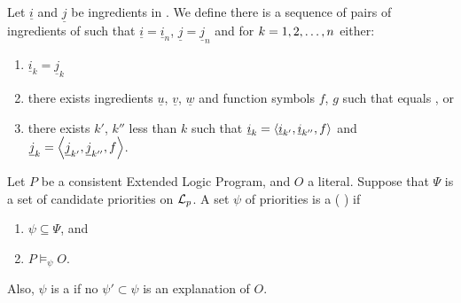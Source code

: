 \begin{defi}
Let $\underline{i}$ and $\underline{j}$ be ingredients in . We define  \iffTx{} there is a sequence of pairs  of ingredients of  such that $\underline{i}=\underline{i}_n$, $\underline{j}=\underline{j}_n$ and for $k=1,2,\ldots,n$ either:
\begin{enumerate}
 \item $\underline{i}_k=\underline{j}_k$
 \item there exists ingredients $\underline{u}$, $\underline{v}$, $\underline{w}$ and function symbols $f$, $g$ such that  equals , or
 \item there exists $k'$, $k''$ less than $k$ such that $\underline{i}_k=\left\langle \underline{i}_{k'},\underline{i}_{k''},f\right\rangle$ and $\underline{j}_k=\left\langle \underline{j}_{k'},\underline{j}_{k''},f\right\rangle$.
\end{enumerate}
\cite{conf/ijcai/Geiser75}
\end{defi}

\begin{defi}
Let $P$ be a consistent Extended Logic Program, and $O$ a literal. Suppose that $\Psi$ is a set of candidate priorities on $\mathcal{L}_p$. A set $\psi$ of priorities is a  (\wrtTx{} ) if
\begin{enumerate}
 \item $\psi\subseteq\Psi$, and
 \item $P\vDash_\psi O$.
\end{enumerate}
Also, $\psi$ is a  if no $\psi'\subset\psi$ is an explanation of $O$.
\cite{conf/ijcai/InoueS99}
\end{defi}

